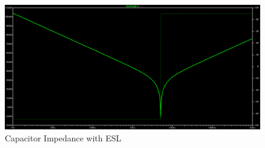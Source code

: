 \begin{figure}
\includegraphics[keepaspectratio=true,width=6in]{./figures/parameters/eslImp.png}
\centering
\caption{Capacitor Impedance with ESL}
\label{eslPlot}
\end{figure}
